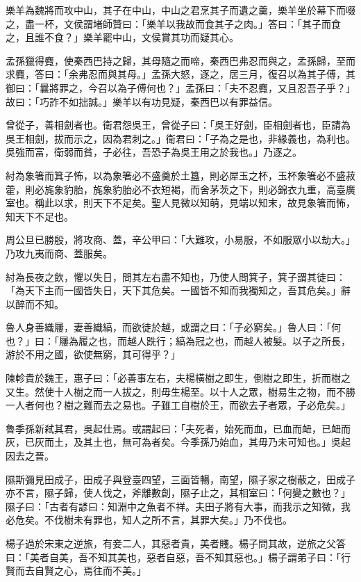 \begin{pinyinscope}
樂羊為魏將而攻中山，其子在中山，中山之君烹其子而遺之羹，樂羊坐於幕下而啜之，盡一杯，文侯謂堵師贊曰：「樂羊以我故而食其子之肉。」答曰：「其子而食之，且誰不食？」樂羊罷中山，文侯賞其功而疑其心。

孟孫獵得麑，使秦西巴持之歸，其母隨之而啼，秦西巴弗忍而與之，孟孫歸，至而求麑，答曰：「余弗忍而與其母。」孟孫大怒，逐之，居三月，復召以為其子傅，其御曰：「曩將罪之，今召以為子傅何也？」孟孫曰：「夫不忍麑，又且忍吾子乎？」故曰：「巧詐不如拙誠。」樂羊以有功見疑，秦西巴以有罪益信。

曾從子，善相劍者也。衛君怨吳王，曾從子曰：「吳王好劍，臣相劍者也，臣請為吳王相劍，拔而示之，因為君刺之。」衛君曰：「子為之是也，非緣義也，為利也。吳強而富，衛弱而貧，子必往，吾恐子為吳王用之於我也。」乃逐之。

紂為象箸而箕子怖，以為象箸必不盛羹於土簋，則必犀玉之杯，玉杯象箸必不盛菽藿，則必旄象豹胎，旄象豹胎必不衣短褐，而舍茅茨之下，則必錦衣九重，高臺廣室也。稱此以求，則天下不足矣。聖人見微以知萌，見端以知末，故見象箸而怖，知天下不足也。

周公旦已勝殷，將攻商、蓋，辛公甲曰：「大難攻，小易服，不如服眾小以劫大。」乃攻九夷而商、蓋服矣。

紂為長夜之飲，懼以失日，問其左右盡不知也，乃使人問箕子，箕子謂其徒曰：「為天下主而一國皆失日，天下其危矣。一國皆不知而我獨知之，吾其危矣。」辭以醉而不知。

魯人身善織屨，妻善織縞，而欲徒於越，或謂之曰：「子必窮矣。」魯人曰：「何也？」曰：「屨為履之也，而越人跣行；縞為冠之也，而越人被髮。以子之所長，游於不用之國，欲使無窮，其可得乎？」

陳軫貴於魏王，惠子曰：「必善事左右，夫楊橫樹之即生，倒樹之即生，折而樹之又生。然使十人樹之而一人拔之，則毋生楊至。以十人之眾，樹易生之物，而不勝一人者何也？樹之難而去之易也。子雖工自樹於王，而欲去子者眾，子必危矣。」

魯季孫新弒其君，吳起仕焉。或謂起曰：「夫死者，始死而血，已血而衄，已衄而灰，已灰而土，及其土也，無可為者矣。今季孫乃始血，其毋乃未可知也。」吳起因去之晉。

隰斯彌見田成子，田成子與登臺四望，三面皆暢，南望，隰子家之樹蔽之，田成子亦不言，隰子歸，使人伐之，斧離數創，隰子止之，其相室曰：「何變之數也？」隰子曰：「古者有諺曰：知淵中之魚者不祥。夫田子將有大事，而我示之知微，我必危矣。不伐樹未有罪也，知人之所不言，其罪大矣。」乃不伐也。

楊子過於宋東之逆旅，有妾二人，其惡者貴，美者賤。楊子問其故，逆旅之父答曰：「美者自美，吾不知其美也，惡者自惡，吾不知其惡也。」楊子謂弟子曰：「行賢而去自賢之心，焉往而不美。」


\end{pinyinscope}
